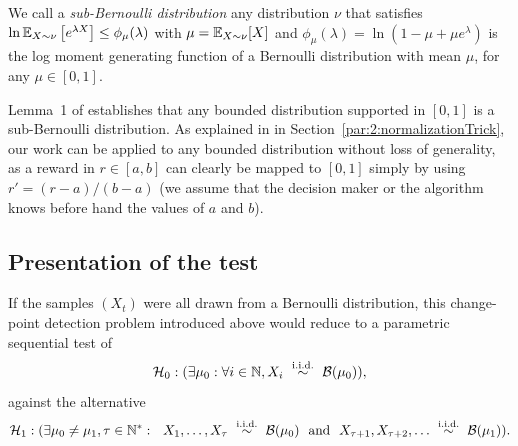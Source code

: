 \begin{definition}\label{def:6:subBernoulliDistributions}
    We call a \emph{sub-Bernoulli distribution} any distribution $\nu$ that satisfies
    $\ln \mathbb{E}_{X\sim\nu}\left[e^{\lambda X}\right] \leq \phi_{\mu}(\lambda)$ with $\mu=\mathbb{E}_{X\sim \nu}[X]$ and $\phi_{\mu}(\lambda) = \ln(1-\mu + \mu e^\lambda)$ is the log moment generating function of a Bernoulli distribution with mean $\mu$, for any $\mu\in[0,1]$.
\end{definition}

Lemma~1 of \cite{KLUCBJournal} establishes that any bounded distribution supported in $[0,1]$ is a sub-Bernoulli distribution.
As explained in in Section~\ref{par:2:normalizationTrick}, our work can be applied to any bounded distribution without loss of generality, as a reward in $r\in[a,b]$ can clearly be mapped to $[0,1]$ simply by using $r' = (r-a)/(b-a)$ (we assume that the decision maker or the algorithm knows before hand the values of $a$ and $b$).


\subsection{Presentation of the test}\label{sub:6:presentationOfGLRTest}

If the samples $(X_t)$ were all drawn from a Bernoulli distribution, this change-point detection problem introduced above would reduce to a parametric sequential test of
\[\cH_0 : (\exists \mu_0: \forall i\in\N, X_i \ \overset{\text{i.i.d.}}{\sim} \ \cB(\mu_0)),\]
against the alternative
\[\cH_1 : (\exists \mu_0 \neq \mu_1, \tau \in \N^*: \ \  X_1, \ldots, X_\tau \ \overset{\text{i.i.d.}}{\sim} \ \cB(\mu_0) \ \ \text{and} \ \ X_{\tau+1}, X_{\tau+2}, \ldots \ \overset{\text{i.i.d.}}{\sim} \ \cB(\mu_1)).\]

